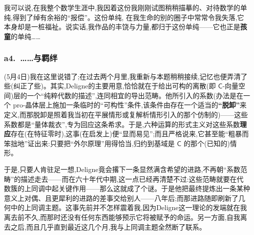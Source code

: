 \dmark{}我可以说,在我整个数学生涯中,我因着这份我刚刚试图稍稍描摹的、对待数学的单纯,得到了绰有余裕的“报偿”。这份单纯,
在我生命的别的圈子中常常令我失落,它本身却是一桩福祉。说实话,我作品的丰饶与力量,都归于这份单纯——它也正是\textbf{孩童}的单纯……

\subsubsection*{a4.~……与羁绊}

\noindent (5月4日)我在这里说错了;在过去两个月里,我重新与本题稍稍接续,记忆也便弄清了些(纠正了些)。其实,Deligne的主要用意,恰恰就在于给出可构的离散(即 $\mathsf{C}$-向量空间)层的一个“纯粹代数的描述”,连同相宜的导出范畴。他所引入的系数(办法是在一个 pro-晶体层上施加一条临时的“可构性”条件,该条件由存在一个适当的\dmark{}\textbf{“脱卸”}来定义,而那脱卸是照着我当初在平展情形或复解析情形引入的那个仿制的)——这些系数都是“量体裁衣”,专为回应这条希求。于是,六种运算的形式主义对这些系数\textbf{理应}存在(在特征零时),这事(在启发上)便“显而易见”;而且严格说来,它甚至能“粗暴而笨拙地”证出来:只要把“外尔原理”用得恰当,归约到基域是 $\mathsf{C}$ 的那个(已知的)情形。

\noindent 于是,只要人肯驻足一想,Deligne竟会撂下一条显然满含希望的进路,不再朝“系数范畴”的描述走去——而在六十年代中期,这一点已经再清楚不过:这些范畴就要在代数簇的上同调中起关键作用——那么这就成了个谜。于是他把最终提炼出一条某种意义上对偶、且更犀利的进路的差事交给别人——八年后;而那进路随即刷新了几何中的上同调主题。这事先前并不怎样震着我,因为Deligne这一理论的发端就在我离去前不久,而那时还没有任何东西能够预示它将被赋予的命运。另一方面,自我离去之后,而且几乎直到最近这几个月,我与上同调主题全然断了联系。

